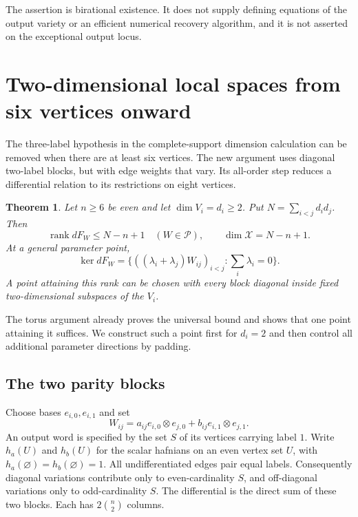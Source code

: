 \documentclass[11pt]{article}
\newtheorem{theorem}{Theorem}[section]
\theoremstyle{remark}\newtheorem{remark}[theorem]{Remark}
\DeclareMathOperator{\rank}{rank}
\newcommand{\cP}{\mathcal P}
\newcommand{\cX}{\mathcal X}
\begin{document}
The assertion is birational existence. It does not supply defining
equations of the output variety or an efficient numerical recovery
algorithm, and it is not asserted on the exceptional output locus.

\section{Two-dimensional local spaces from six vertices onward}
\label{sec:qubits}

The three-label hypothesis in the complete-support dimension calculation
can be removed when there are at least six vertices. The new argument uses diagonal
two-label blocks, but with edge weights that vary. Its all-order step
reduces a differential relation to its restrictions on eight vertices.

\begin{theorem}\label{thm:qubit}
Let $n\geq6$ be even and let $\dim V_i=d_i\geq2$. Put
$N=\sum_{i<j}d_id_j$. Then
\[
 \rank dF_W\leq N-n+1
 \quad(W\in\cP),\qquad
 \dim\cX=N-n+1.
\]
At a general parameter point,
\[
 \ker dF_W=
 \{((\lambda_i+\lambda_j)W_{ij})_{i<j}:
        \textstyle\sum_i\lambda_i=0\}.
\]
A point attaining this rank can be chosen with every block diagonal
inside fixed two-dimensional subspaces of the $V_i$.
\end{theorem}

The torus argument already proves the universal bound and shows that
one point attaining it suffices. We construct such a point first for
$d_i=2$ and then control all additional parameter directions by padding.

\subsection{The two parity blocks}
Choose bases $e_{i,0},e_{i,1}$ and set
\[
 W_{ij}=a_{ij}e_{i,0}\otimes e_{j,0}
       +b_{ij}e_{i,1}\otimes e_{j,1}.
\]
An output word is specified by the set $S$ of its vertices carrying
label $1$. Write $h_a(U)$ and $h_b(U)$ for the scalar hafnians on an
even vertex set $U$, with $h_a(\varnothing)=h_b(\varnothing)=1$.
All undifferentiated edges pair equal labels. Consequently diagonal
variations contribute only to even-cardinality $S$, and off-diagonal
variations only to odd-cardinality $S$. The differential is the direct
sum of these two blocks. Each has $2\binom n2$ columns.
\end{document}
